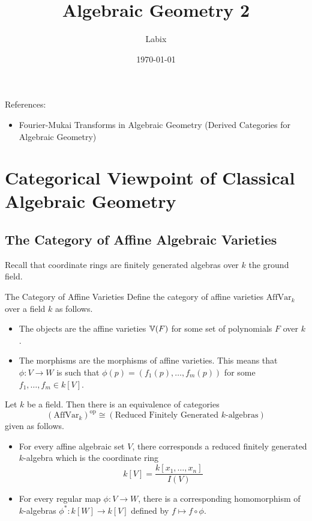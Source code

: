 \documentclass[a4paper]{article}
\title{Algebraic Geometry 2}
\author{Labix}
\date{\today}
\begin{document}
\maketitle
\begin{abstract}
\end{abstract}

References: 
\begin{itemize}
\item Fourier-Mukai Transforms in Algebraic Geometry (Derived Categories for Algebraic Geometry)
\end{itemize}
\pagebreak
\tableofcontents
\pagebreak

\section{Categorical Viewpoint of Classical Algebraic Geometry}
\subsection{The Category of Affine Algebraic Varieties}
Recall that coordinate rings are finitely generated algebras over $k$ the ground field. 

\begin{defn}{The Category of Affine Varieties}{} Define the category of affine varieties $\text{AffVar}_k$ over a field $k$ as follows. 
\begin{itemize}
\item The objects are the affine varieties $\mathbb{V}(F)$ for some set of polynomials $F$ over $k$. 
\item The morphisms are the morphisms of affine varieties. This means that $\phi:V\to W$ is such that $\phi(p)=(f_1(p),\dots,f_m(p))$ for some $f_1,\dots,f_m\in k[V]$. 
\end{itemize}
\end{defn}

\begin{prp}{}{} Let $k$ be a field. Then there is an equivalence of categories $$(\text{AffVar}_k)^\text{op}\cong(\text{Reduced Finitely Generated }k\text{-algebras})$$
given as follows. 
\begin{itemize}
\item For every affine algebraic set $V$, there corresponds a reduced finitely generated $k$-algebra which is the coordinate ring $$k[V]=\frac{k[x_1,\dots,x_n]}{I(V)}$$
\item For every regular map $\phi:V\to W$, there is a corresponding homomorphism of $k$-algebras $\phi^\ast:k[W]\to k[V]$ defined by $f\mapsto f\circ\phi$. 
\end{itemize}
\end{prp}
\end{document}
